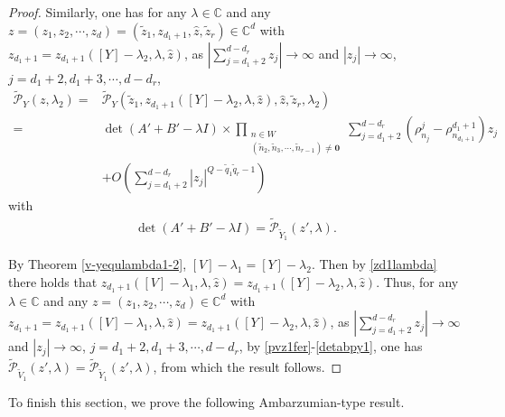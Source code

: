 \documentclass[12pt,letterpaper]{amsart}
\newcommand{\abs}[1]{\left\lvert #1 \right\rvert}
\def\C{{\mathbb C}}
\begin{document}
\begin{proof}
Similarly, one has
for any $\lambda\in\C$ and any $z=(z_1,z_2,\cdots,z_d)=(\tilde{z}_1,z_{d_1+1},\hat{z},\tilde{z}_r)\in\C^d$ with $z_{d_1+1}=z_{d_1+1}([Y]-\lambda_2,\lambda,\hat{z})$,
as $\abs{\sum_{j=d_1+2}^{d-d_r}z_j}\to\infty$
and $\abs{z_j}\to\infty$, $j=d_1+2,d_1+3,\cdots,d-d_r$,
\begin{align}
\tilde{\mathcal{P}}_Y(z,\lambda_2)=&\tilde{\mathcal{P}}_Y(\tilde{z}_1,z_{d_1+1}([Y]-\lambda_2,\lambda,\hat{z}),\hat{z},\tilde{z}_r,\lambda_2)\label{pyz1fer}\\
=&\det(A'+B'-\lambda I)\times\prod_{\substack{n\in W\\(\tilde{n}_2,\tilde{n}_3,\cdots,\tilde{n}_{r-1})\neq \mathbf{0}}}\sum_{j={d_1+2}}^{d-d_r}\left(\rho^j_{n_j}-\rho^{d_1+1}_{n_{d_1+1}}\right)z_j\nonumber\\
&+O\left(\sum_{j=d_1+2}^{d-d_r}\abs{z_j}^{Q-\tilde{q}_1\tilde{q}_r-1}\right)\nonumber
\end{align}
with
\begin{align}
\det(A'+B'-\lambda I)=\tilde{\mathcal{P}}_{\tilde{Y}_1}(z',\lambda).\label{detabpy1}
\end{align}

By Theorem \ref{v-yequlambda1-2}, $[V]-\lambda_1=[Y]-\lambda_2$. Then by \eqref{zd1lambda} there holds that $z_{d_1+1}([V]-\lambda_1,\lambda,\hat{z})=z_{d_1+1}([Y]-\lambda_2,\lambda,\hat{z})$.
Thus, for any $\lambda\in\C$ and any $z=(z_1,z_2,\cdots,z_d)\in\C^d$ with $z_{d_1+1}=z_{d_1+1}([V]-\lambda_1,\lambda,\hat{z})=z_{d_1+1}([Y]-\lambda_2,\lambda,\hat{z})$,
as $\abs{\sum_{j=d_1+2}^{d-d_r}z_j}\to\infty$
and $\abs{z_j}\to\infty$, $j=d_1+2,d_1+3,\cdots,d-d_r$, by \eqref{pvz1fer}-\eqref{detabpy1}, one has $\tilde{\mathcal{P}}_{\tilde{V}_1}(z',\lambda)=\tilde{\mathcal{P}}_{\tilde{Y}_1}(z',\lambda)$, from which the result follows.
\end{proof}

To finish this section, we prove the following Ambarzumian-type result.
\end{document}
